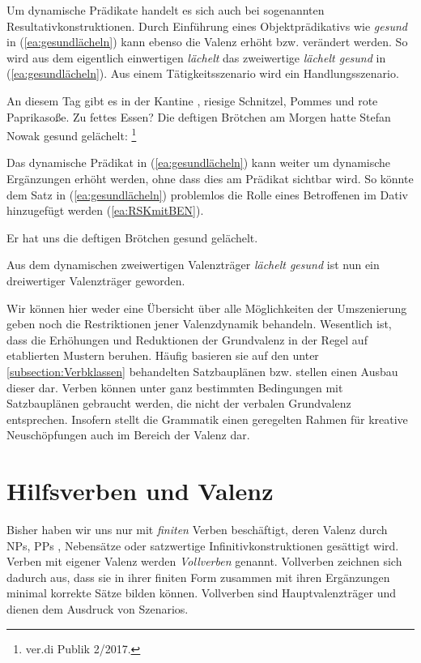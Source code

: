 Um dynamische Prädikate handelt es sich auch bei sogenannten Resultativkonstruktionen. Durch Einführung eines Objektprädikativs wie \textit{gesund} in (\ref{ea:gesundlächeln}) kann ebenso die Valenz erhöht bzw. verändert werden. So wird aus dem eigentlich einwertigen \textit{lächelt} das zweiwertige \textit{lächelt gesund} in (\ref{ea:gesundlächeln}). Aus einem Tätigkeitsszenario wird ein Handlungsszenario. 

\eanoraggedright \label{ea:gesundlächeln} An diesem Tag gibt es in der Kantine , riesige Schnitzel, Pommes und rote Paprikasoße. Zu fettes Essen? Die deftigen Brötchen am Morgen hatte Stefan Nowak gesund gelächelt: \footnote{ver.di Publik 2/2017.}
\z 

Das dynamische Prädikat in (\ref{ea:gesundlächeln}) kann weiter um dynamische Ergänzungen erhöht werden, ohne dass dies am Prädikat sichtbar wird. So könnte dem Satz in (\ref{ea:gesundlächeln}) problemlos die Rolle eines Betroffenen im Dativ hinzugefügt werden (\ref{ea:RSKmitBEN}). 

\ea \label{ea:RSKmitBEN} Er hat uns die deftigen Brötchen gesund gelächelt.
\z 

Aus dem dynamischen zweiwertigen Valenzträger \textit{lächelt gesund} ist nun ein dreiwertiger Valenzträger geworden.

Wir können hier weder eine Übersicht über alle Möglichkeiten der Umszenierung geben noch die Restriktionen jener Valenzdynamik behandeln. Wesentlich ist, dass die Erhöhungen und Reduktionen der Grundvalenz in der Regel auf etablierten Mustern beruhen. Häufig basieren sie auf den unter \ref{subsection:Verbklassen} behandelten Satzbauplänen bzw. stellen einen Ausbau dieser dar. Verben können unter ganz bestimmten Bedingungen mit Satzbauplänen gebraucht werden, die nicht der verbalen Grundvalenz entsprechen. Insofern stellt die Grammatik einen geregelten Rahmen für kreative Neuschöpfungen auch im Bereich der Valenz dar. 


\section{Hilfsverben und Valenz}\label{section:RegierteVerben}

Bisher haben wir uns nur mit \textit{finiten} Verben beschäftigt, deren Valenz durch NPs, PPs , Nebensätze oder satzwertige Infinitivkonstruktionen gesättigt wird. Verben mit eigener Valenz werden \textit{Vollverben} genannt. Vollverben zeichnen sich dadurch aus, dass sie in ihrer finiten Form zusammen mit ihren Ergänzungen minimal korrekte Sätze bilden können. Vollverben sind Hauptvalenzträger und dienen dem Ausdruck von Szenarios.

